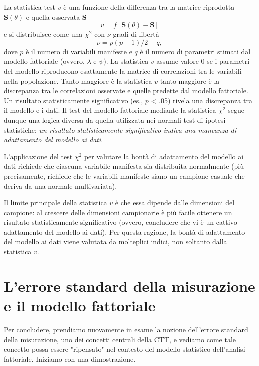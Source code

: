 La statistica test $v$ è una funzione della differenza tra la matrice 
riprodotta $\boldsymbol{S}(\theta)$  e quella osservata $\boldsymbol{S}$
$$
v = f\left[\boldsymbol{S}(\theta) - \boldsymbol{S}\right]
$$
e si distribuisce come una $\chi^2$ con $\nu$ gradi di libertà
$$
\nu = p(p+1)/ 2 - q,
$$
dove $p$ è il numero di variabili manifeste e $q$ è il numero di parametri stimati
dal modello fattoriale (ovvero, $\lambda$ e $\psi$).
La statistica $v$ assume valore 0 se i parametri del modello riproducono 
esattamente la matrice di correlazioni tra le variabili nella popolazione.
 Tanto maggiore è  la statistica  $v$ tanto maggiore è la discrepanza tra le correlazioni osservate e quelle predette dal modello fattoriale.
Un risultato statisticamente significativo (es., $p$ < .05) rivela una discrepanza tra il modello e i dati.
 Il test del modello fattoriale mediante la statistica $\chi^2$ segue dunque una logica diversa da quella utilizzata nei normali test di ipotesi statistiche: \textit{un risultato statisticamente significativo indica una mancanza di adattamento del modello ai dati}.

L'applicazione del test  $\chi^2$  per valutare la bontà di adattamento del modello ai dati richiede che ciascuna variabile manifesta sia distribuita normalmente (più precisamente, richiede che le variabili manifeste siano un campione casuale che deriva da una normale multivariata).

Il limite principale della statistica $v$ è che essa dipende dalle dimensioni del campione: al crescere delle dimensioni campionarie è più facile ottenere un risultato statisticamente significativo (ovvero, concludere che vi è un cattivo adattamento del modello ai dati).
Per questa ragione, la bontà di adattamento del modello ai dati viene valutata da molteplici indici, non soltanto dalla statistica $v$. 
 

\section{L'errore standard della misurazione e il modello fattoriale}

Per concludere, prendiamo nuovamente in esame la nozione dell'errore standard della misurazione, uno dei concetti centrali della CTT, e vediamo come tale concetto possa essere "ripensato" nel contesto del modello statistico dell'analisi fattoriale.
Iniziamo con una dimostrazione.

